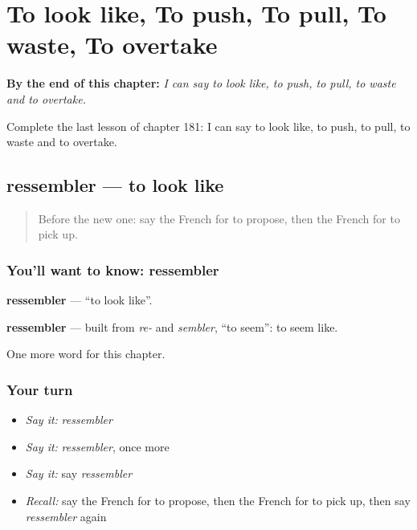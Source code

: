 
\chapter{To look like, To push, To pull, To waste, To overtake}
\label{ch:fr-to-look-like-to-push-to-pull-to-waste-to-overtake}

\begin{chapteropening}
\textbf{By the end of this chapter:} \emph{I can say to look like, to push, to pull, to waste and to overtake.}

Complete the last lesson of chapter 181: I can say to look like, to push, to pull, to waste and to overtake.
\end{chapteropening}

\section[ressembler]{ressembler — to look like}

\label{lesson:FR-C181-ressembler}



\begin{quote}
Before the new one: say the French for to propose, then the French for to pick up.
\end{quote}

\subsection*{You'll want to know: ressembler}
\textbf{ressembler} — \textquotedblleft{}to look like\textquotedblright{}.

\begin{cousinweb}
\textbf{ressembler} — built from \emph{re-} and \emph{sembler}, \textquotedblleft{}to seem\textquotedblright{}: to seem like.
\end{cousinweb}

\begin{grammarlens}[title={What you've built}]
One more word for this chapter.
\end{grammarlens}

\subsection*{Your turn}
\begin{itemize}
\raggedright
  \item \emph{Say it:} \emph{ressembler}
  \item \emph{Say it:} \emph{ressembler}, once more
  \item \emph{Say it:} say \emph{ressembler}
  \item \emph{Recall:} say the French for to propose, then the French for to pick up, then say \emph{ressembler} again
\end{itemize}

